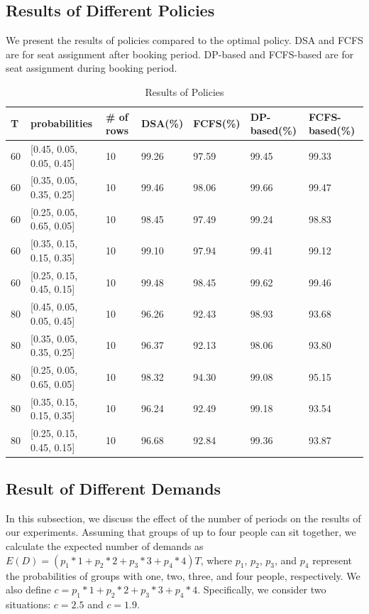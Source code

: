 \subsection{Results of Different Policies}

We present the results of policies compared to the optimal policy. DSA and FCFS are for seat assignment after booking period. DP-based and FCFS-based are for seat assignment during booking period.

\begin{table}[ht]
  \centering
  \caption{Results of Policies}
  \begin{tabular}{|l|l|l|l|l|l|l|}
  \hline
   T & probabilities & \# of rows & DSA(\%) & FCFS(\%) & DP-based(\%) & FCFS-based(\%) \\
  \hline
   60  & [0.45, 0.05, 0.05, 0.45] & 10 & 99.26 & 97.59 & 99.45 & 99.33 \\
   60  & [0.35, 0.05, 0.35, 0.25] & 10 & 99.46 & 98.06 & 99.66 & 99.47 \\
   60  & [0.25, 0.05, 0.65, 0.05] & 10 & 98.45 & 97.49 & 99.24 & 98.83 \\ %
   60  & [0.35, 0.15, 0.15, 0.35] & 10 & 99.10 & 97.94 & 99.41 & 99.12 \\
   60  & [0.25, 0.15, 0.45, 0.15] & 10 & 99.48 & 98.45 & 99.62 & 99.46 \\
   80  & [0.45, 0.05, 0.05, 0.45] & 10 & 96.26 & 92.43 & 98.93 & 93.68 \\
   80  & [0.35, 0.05, 0.35, 0.25] & 10 & 96.37 & 92.13 & 98.06 & 93.80 \\
   80  & [0.25, 0.05, 0.65, 0.05] & 10 & 98.32 & 94.30 & 99.08 & 95.15 \\
   80  & [0.35, 0.15, 0.15, 0.35] & 10 & 96.24 & 92.49 & 99.18 & 93.54 \\
   80  & [0.25, 0.15, 0.45, 0.15] & 10 & 96.68 & 92.84 & 99.36 & 93.87 \\
  \hline
  \end{tabular}
\end{table}


\subsection{Result of Different Demands}

In this subsection, we discuss the effect of the number of periods on the results of our experiments. 
Assuming that groups of up to four people can sit together, we calculate the expected number of demands as $E(D) = (p_1 * 1 + p_2 * 2 + p_3 * 3 + p_4 * 4) T$, where $p_1$, $p_2$, $p_3$, and $p_4$ represent the probabilities of groups with one, two, three, and four people, respectively. We also define $c = p_1 * 1 + p_2 * 2 + p_3 * 3 + p_4 * 4$. Specifically, we consider two situations: $c = 2.5$ and $c = 1.9$.

